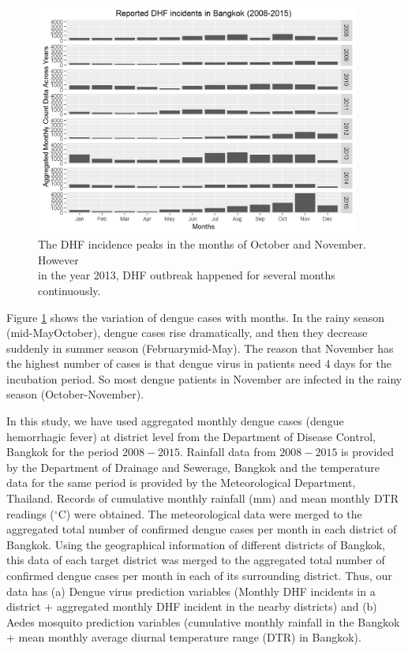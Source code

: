 \documentclass{bmcart}
\begin{document}
\begin{figure}[htbp]
	\begin{center}
		\includegraphics[width= 0.95\textwidth]{5-MonthlyDengueAcrossYears}
		\caption{The DHF incidence peaks in the months of October and November. However \\ in the year 2013, DHF outbreak happened for several months continuously.}
		\label{figure-MonthlyDengueAcrossYears}
	\end{center}
\end{figure}


Figure \ref{figure-MonthlyDengueAcrossYears} %
shows the variation of dengue cases with months. In the rainy season (mid-May\textendash October), dengue cases rise dramatically, and then they decrease suddenly in summer season (February\textemdash mid-May). The reason that November has the highest number of cases is that dengue virus in patients need 4 days for the incubation period. So most dengue patients in November are infected in the rainy season (October-November).  

In this study, we have used aggregated monthly dengue cases (dengue hemorrhagic fever) at district level from the Department of Disease Control, Bangkok for the period $2008-2015$.  Rainfall data from $2008-2015$ is provided by the Department of Drainage and Sewerage, Bangkok and the temperature data for the same period is provided by the Meteorological Department, Thailand. Records of cumulative monthly rainfall (mm) and mean monthly DTR readings ($^{\circ}$C) were obtained. The meteorological data were merged to the aggregated total number of confirmed dengue cases per month in each district of Bangkok. Using the geographical information of different districts of Bangkok, this data of each target district was merged to the  aggregated total number of confirmed dengue cases per month in each of its surrounding district. Thus, our data has (a) Dengue virus prediction variables (Monthly DHF incidents in a district + aggregated monthly DHF incident in the nearby districts) and (b) Aedes mosquito prediction variables (cumulative monthly rainfall in the Bangkok + mean monthly average diurnal temperature range (DTR) in Bangkok). 
\end{document}
